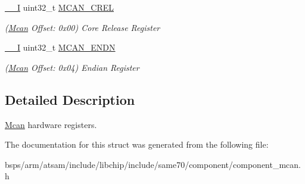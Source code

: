 \begin{DoxyCompactItemize}
\mbox{\label{structMcan_ab5a30e49bf24d55ef5506405f0191932}} 
\mbox{\hyperlink{core__cm7_8h_af63697ed9952cc71e1225efe205f6cd3}{\+\_\+\+\_\+I}} uint32\+\_\+t \mbox{\hyperlink{structMcan_ab5a30e49bf24d55ef5506405f0191932}{M\+C\+A\+N\+\_\+\+C\+R\+EL}}
\begin{DoxyCompactList}\small\item\em (\mbox{\hyperlink{structMcan}{Mcan}} Offset\+: 0x00) Core Release Register \end{DoxyCompactList}\item 
\mbox{\label{structMcan_a31d82202181b35991402314659af96cb}} 
\mbox{\hyperlink{core__cm7_8h_af63697ed9952cc71e1225efe205f6cd3}{\+\_\+\+\_\+I}} uint32\+\_\+t \mbox{\hyperlink{structMcan_a31d82202181b35991402314659af96cb}{M\+C\+A\+N\+\_\+\+E\+N\+DN}}
\begin{DoxyCompactList}\small\item\em (\mbox{\hyperlink{structMcan}{Mcan}} Offset\+: 0x04) Endian Register \end{DoxyCompactList}\end{DoxyCompactItemize}


\subsection{Detailed Description}
\mbox{\hyperlink{structMcan}{Mcan}} hardware registers. 

The documentation for this struct was generated from the following file\+:\begin{DoxyCompactItemize}
\item 
bsps/arm/atsam/include/libchip/include/same70/component/component\+\_\+mcan.\+h\end{DoxyCompactItemize}
